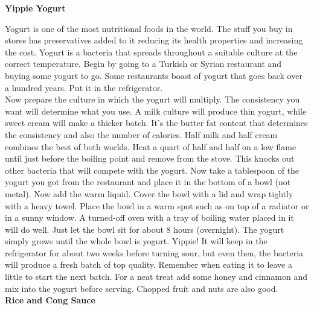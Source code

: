 \documentclass[11pt,twoside,a4paper]{book}
\begin{document}
\textbf{Yippie Yogurt}

Yogurt is one of the most nutritional foods in the world. The stuff you buy in stores has preservatives added to it reducing its health properties and increasing the cost. Yogurt is a bacteria that spreads throughout a suitable culture at the correct temperature. Begin by going to a Turkish or Syrian restaurant and buying some yogurt to go. Some restaurants boast of yogurt that goes back over a hundred years. Put it in the refrigerator.~\\

Now prepare the culture in which the yogurt will multiply. The consistency you want will determine what you use. A milk culture will produce thin yogurt, while sweet cream will make a thicker batch. It's the butter fat content that determines the consistency and also the number of calories. Half milk and half cream combines the best of both worlds. Heat a quart of half and half on a low flame until just before the boiling point and remove from the stove. This knocks out other bacteria that will compete with the yogurt. Now take a tablespoon of the yogurt you got from the restaurant and place it in the bottom of a bowl (not metal). Now add the warm liquid. Cover the bowl with a lid and wrap tightly with a heavy towel. Place the bowl in a warm spot such as on top of a radiator or in a sunny window. A turned-off oven with a tray of boiling water placed in it will do well. Just let the bowl sit for about 8 hours (overnight). The yogurt simply grows until the whole bowl is yogurt. Yippie! It will keep in the refrigerator for about two weeks before turning sour, but even then, the bacteria will produce a fresh batch of top quality. Remember when eating it to leave a little to start the next batch. For a neat treat add some honey and cinnamon and mix into the yogurt before serving. Chopped fruit and nuts are also good.~\\

\textbf{Rice and Cong Sauce}
\end{document}
